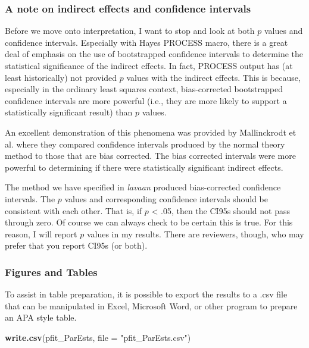 \documentclass[
  11pt,
]{book}
\newenvironment{Shaded}{\begin{snugshade}}{\end{snugshade}}
\newcommand{\AttributeTok}[1]{\textcolor[rgb]{0.27,0.27,0.27}{#1}}
\newcommand{\FunctionTok}[1]{\textcolor[rgb]{0.27,0.27,0.27}{\textbf{#1}}}
\newcommand{\NormalTok}[1]{#1}
\newcommand{\StringTok}[1]{\textcolor[rgb]{0.5,0.5,0.5}{#1}}
\begin{document}
\hypertarget{a-note-on-indirect-effects-and-confidence-intervals}{%
\subsubsection{A note on indirect effects and confidence intervals}\label{a-note-on-indirect-effects-and-confidence-intervals}}

Before we move onto interpretation, I want to stop and look at both \(p\) values and confidence intervals. Especially with Hayes \citeyearpar{hayes_more_2022} PROCESS macro, there is a great deal of emphasis on the use of bootstrapped confidence intervals to determine the statistical significance of the indirect effects. In fact, PROCESS output has (at least historically) not provided \(p\) values with the indirect effects. This is because, especially in the ordinary least squares context, bias-corrected bootstrapped confidence intervals are more powerful (i.e., they are more likely to support a statistically significant result) than \(p\) values.

An excellent demonstration of this phenomena was provided by Mallinckrodt et al. \citeyearpar{mallinckrodt_advances_2006} where they compared confidence intervals produced by the normal theory method to those that are bias corrected. The bias corrected intervals were more powerful to determining if there were statistically significant indirect effects.

The method we have specified in \emph{lavaan} produced bias-corrected confidence intervals. The \(p\) values and corresponding confidence intervals should be consistent with each other. That is, if \(p\) \textless{} .05, then the CI95s should not pass through zero. Of course we can always check to be certain this is true. For this reason, I will report \(p\) values in my results. There are reviewers, though, who may prefer that you report CI95s (or both).

\hypertarget{figures-and-tables}{%
\subsubsection{Figures and Tables}\label{figures-and-tables}}

To assist in table preparation, it is possible to export the results to a .csv file that can be manipulated in Excel, Microsoft Word, or other program to prepare an APA style table.

\begin{Shaded}
\begin{Highlighting}[]
\FunctionTok{write.csv}\NormalTok{(pfit\_ParEsts, }\AttributeTok{file =} \StringTok{"pfit\_ParEsts.csv"}\NormalTok{)}
\end{Highlighting}
\end{Shaded}
\end{document}
